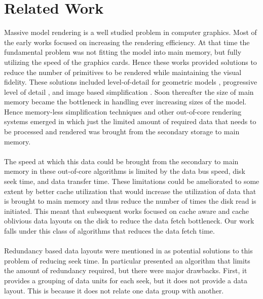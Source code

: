 
\section{Related Work}

Massive model rendering is a well studied problem in computer graphics. Most of
the early works focused on increasing the rendering efficiency. At that time
the fundamental problem was not fitting the model into main memory, but
fully utilizing the speed of the graphics cards. Hence these works provided
solutions to reduce the number of primitives to be rendered while maintaining
the visual fidelity. These solutions included level-of-detail for geometric
models \cite{Luebke02}, progressive level of detail
\cite{Hoppe:98b,Hoppe:97,Hoppe:96,SG:01}, and image based simplification
\cite{ACWBZEHHSBWBM:99}. Soon thereafter the size of main memory became the
bottleneck in handling ever increasing sizes of the model. Hence memory-less
simplification techniques \cite{LT:99}  and other out-of-core rendering systems
\cite{Silva02,VM:02} emerged in which just the limited amount of required data
that needs to be processed and rendered was brought from the secondary storage
to main memory. \\
\\
The speed at which this data
could be brought from the secondary to main memory in these out-of-core
algorithms is limited by the data bus speed, disk seek time, and data transfer
time. These limitations could be ameliorated to some extent by
better cache utilization that would increase the utilization of data that is
brought to main memory and thus reduce the number of times the disk read is
initiated. This meant that subsequent works focused on cache aware
\cite{ssdpaper} and cache oblivious data layouts
\cite{cacheobliviouslayout,YOON:2006:MeshLayout} on the disk to reduce the
data fetch bottleneck. Our work falls under this class of algorithms that
reduces the data fetch time. \\
\\
Redundancy based data layouts were mentioned in
\cite{Patterson88,singleseeklayout,optimizingredundancy} as potential solutions
to this problem of reducing seek time. In particular
\cite{optimizingredundancy} presented an algorithm that limits the amount of
redundancy required, but there were major drawbacks. First, it provides a
grouping of data units for each seek, but it does not provide a data layout.
This is because it does not relate one data group with another.
